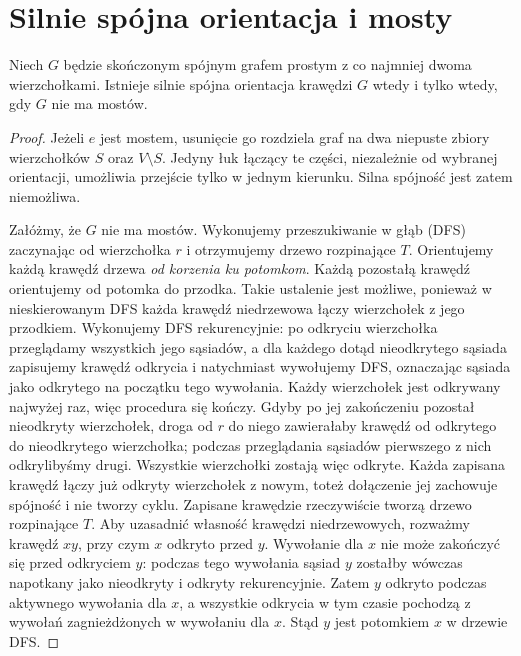 \section{Silnie spójna orientacja i mosty}
\label{sec:tg-robbins}

\begin{twierdzenie}[Robbins]
\label{thm:tg-robbins}
Niech $G$ będzie skończonym spójnym grafem prostym
z co najmniej dwoma wierzchołkami. Istnieje silnie spójna
orientacja krawędzi $G$ wtedy i tylko wtedy,
gdy $G$ nie ma mostów.
\end{twierdzenie}

\begin{proof}
Jeżeli $e$ jest mostem, usunięcie go rozdziela graf na dwa
niepuste zbiory wierzchołków $S$ oraz $V\setminus S$.
Jedyny łuk łączący te części, niezależnie od wybranej
orientacji, umożliwia przejście tylko w jednym kierunku.
Silna spójność jest zatem niemożliwa.

Załóżmy, że $G$ nie ma mostów. Wykonujemy przeszukiwanie
w głąb (DFS) zaczynając od wierzchołka $r$ i otrzymujemy
drzewo rozpinające $T$. Orientujemy każdą krawędź drzewa
\emph{od korzenia ku potomkom}. Każdą pozostałą krawędź
orientujemy od potomka do przodka. Takie ustalenie
jest możliwe, ponieważ w nieskierowanym DFS każda
krawędź niedrzewowa łączy wierzchołek z jego przodkiem.
Wykonujemy DFS rekurencyjnie: po odkryciu wierzchołka
przeglądamy wszystkich jego sąsiadów, a dla każdego
dotąd nieodkrytego sąsiada zapisujemy krawędź odkrycia
i natychmiast wywołujemy DFS, oznaczając sąsiada jako
odkrytego na początku tego wywołania. Każdy wierzchołek
jest odkrywany najwyżej raz, więc procedura się kończy.
Gdyby po jej zakończeniu pozostał nieodkryty wierzchołek,
droga od $r$ do niego zawierałaby krawędź od odkrytego
do nieodkrytego wierzchołka; podczas przeglądania
sąsiadów pierwszego z nich odkrylibyśmy drugi.
Wszystkie wierzchołki zostają więc odkryte.
Każda zapisana krawędź łączy już odkryty wierzchołek
z nowym, toteż dołączenie jej zachowuje spójność
i nie tworzy cyklu. Zapisane krawędzie rzeczywiście
tworzą drzewo rozpinające $T$.
Aby uzasadnić własność krawędzi niedrzewowych, rozważmy
krawędź $xy$, przy czym $x$ odkryto przed $y$.
Wywołanie dla $x$ nie może zakończyć się przed odkryciem
$y$: podczas tego wywołania sąsiad $y$ zostałby wówczas
napotkany jako nieodkryty i odkryty rekurencyjnie.
Zatem $y$ odkryto podczas aktywnego wywołania dla $x$,
a wszystkie odkrycia w tym czasie pochodzą z wywołań
zagnieżdżonych w wywołaniu dla $x$. Stąd $y$ jest
potomkiem $x$ w drzewie DFS.


\end{proof}

